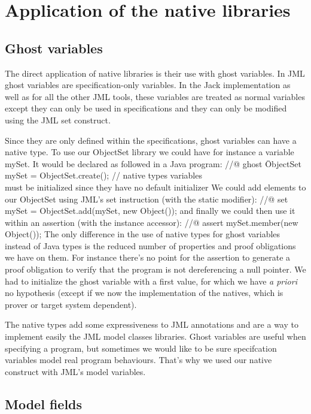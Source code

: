 \section{Application of the native libraries}
\subsection{Ghost variables}
The direct application of native libraries is their use with  ghost variables. 
In JML ghost variables are specification-only variables.
In the Jack implementation as well as for all the other JML tools, 
these variables are treated as normal variables
except they can only be used in specifications and they can only be modified 
using the JML set construct.
 
Since they are only defined within the specifications, ghost variables can have a native type. 
To use our ObjectSet library we could have for instance a variable mySet. It would be 
declared as followed in a Java program:
\btab
 //@ ghost \=ObjectSet mySet = ObjectSet.create(); // native types variables\\
\>  must be initialized since they have no default initializer
 \etab
 We could add elements to our ObjectSet using JML's set instruction (with the static modifier):
 \btab
 //@ set mySet = ObjectSet.add(mySet, new Object());
 \etab
and  finally we could then use it within an assertion (with the instance accessor):
\btab
 //@ assert mySet.member(new Object());
 \etab
The only difference in the use of native types for ghost variables instead of Java types 
is the reduced number of properties and proof obligations we have on them. For instance 
there's no point for the assertion to generate a proof obligation  to verify that the program 
is not dereferencing a null pointer. We had to initialize the ghost variable 
with a first value, for which we have {\it a priori} no hypothesis  (except if we now the
 implementation  of the natives, which is prover or target system dependent).

The native types add some expressiveness to JML annotations and are a way to implement 
easily the JML model classes libraries.
Ghost variables are useful when specifying a program, but sometimes we would like to be
sure specifcation variables model real program behaviours. That's why we used our native
construct with JML's model variables.



\subsection{Model fields}
